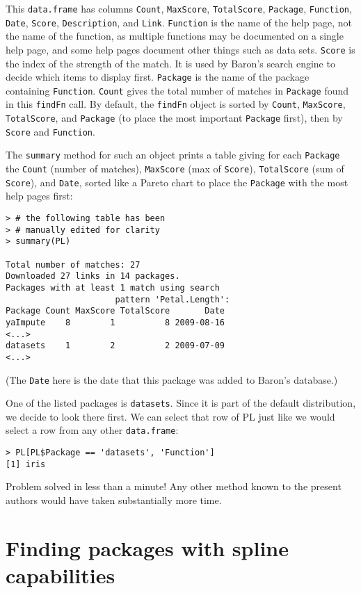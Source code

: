This {\tt data.frame} has columns {\tt Count},
{\tt MaxScore}, {\tt TotalScore}, {\tt Package}, {\tt Function},
{\tt Date}, {\tt Score}, {\tt Description}, and {\tt Link}.
{\tt Function} is the name of the help page, not the name of the
function, as multiple functions may be documented on a single
help page, and some help pages document other things such as data
sets.  {\tt Score} is the index of the strength of the match.  It is used
by Baron's search engine to decide which items to display first.
{\tt Package} is the name of the package containing {\tt Function}.
{\tt Count} gives the total number of matches in {\tt Package} found in this
{\tt findFn} call.  By default, the {\tt findFn} object is sorted by
{\tt Count}, {\tt MaxScore}, {\tt TotalScore},
and {\tt Package} (to place the most important {\tt Package}
first), then by {\tt Score} and {\tt Function}.

The {\tt summary} method for such an object prints a table giving
for each {\tt Package} the {\tt Count} (number of matches),
{\tt MaxScore} (max of {\tt Score}), {\tt TotalScore} (sum of
{\tt Score}), and {\tt Date}, sorted like a Pareto chart to place
the {\tt Package} with the most help pages first:
\begin{verbatim}
> # the following table has been
> # manually edited for clarity
> summary(PL)

Total number of matches: 27
Downloaded 27 links in 14 packages.
Packages with at least 1 match using search
                      pattern 'Petal.Length':
Package Count MaxScore TotalScore       Date
yaImpute    8        1          8 2009-08-16
<...>
datasets    1        2          2 2009-07-09
<...>
\end{verbatim}
(The {\tt Date} here is the date that this package was added
to Baron's database.)

One of the listed packages is {\tt datasets}.  Since it is part of the
default \R{} distribution, we decide to look there first.  We can
select that row of PL just like we would select a row from any other
{\tt data.frame}:
\begin{verbatim}
> PL[PL$Package == 'datasets', 'Function']
[1] iris
\end{verbatim}
Problem solved in less than a minute!  Any other method known
to the present authors would have taken substantially more time.

\section{Finding packages with spline capabilities}

